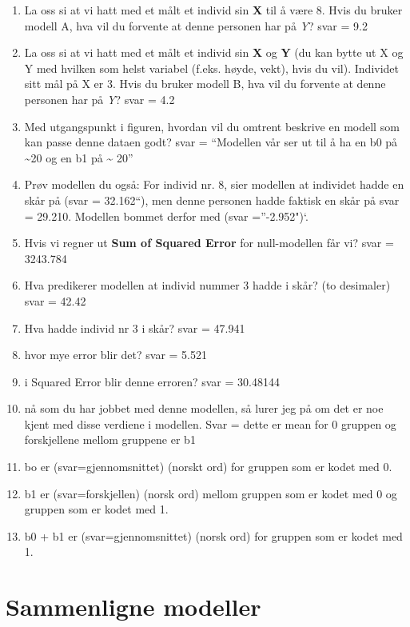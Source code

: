 \documentclass[
]{book}
\begin{document}
\begin{enumerate}
\def\labelenumi{\alph{enumi}.}
\item
  La oss si at vi hatt med et målt et individ sin \textbf{X} til å være 8. Hvis du bruker modell A, hva vil du forvente at denne personen har på \emph{Y}? svar = 9.2
\item
  La oss si at vi hatt med et målt et individ sin \textbf{X} og \textbf{Y} (du kan bytte ut X og Y med hvilken som helst variabel (f.eks. høyde, vekt), hvis du vil). Individet sitt mål på X er 3. Hvis du bruker modell B, hva vil du forvente at denne personen har på \emph{Y}? svar = 4.2
\item
  Med utgangspunkt i figuren, hvordan vil du omtrent beskrive en modell som kan passe denne dataen godt? svar = ``Modellen vår ser ut til å ha en b0 på \textasciitilde20 og en b1 på \textasciitilde{} 20''
\item
  Prøv modellen du også: For individ nr. 8, sier modellen at individet hadde en skår på (svar = 32.162``), men denne personen hadde faktisk en skår på svar = 29.210. Modellen bommet derfor med (svar =''-2.952")`.
\item
  Hvis vi regner ut \textbf{Sum of Squared Error} for null-modellen får vi? svar = 3243.784
\item
  Hva predikerer modellen at individ nummer 3 hadde i skår? (to desimaler) svar = 42.42
\item
  Hva hadde individ nr 3 i skår? svar = 47.941
\item
  hvor mye error blir det? svar = 5.521
\item
  i Squared Error blir denne erroren? svar = 30.48144
\item
  nå som du har jobbet med denne modellen, så lurer jeg på om det er noe kjent med disse verdiene i modellen. Svar = dette er mean for 0 gruppen og forskjellene mellom gruppene er b1
\item
  bo er (svar=gjennomsnittet) (norskt ord) for gruppen som er kodet med 0.
\item
  b1 er (svar=forskjellen) (norsk ord) mellom gruppen som er kodet med 0 og gruppen som er kodet med 1.
\item
  b0 + b1 er (svar=gjennomsnittet) (norsk ord) for gruppen som er kodet med 1.
\end{enumerate}

\hypertarget{sammenligne-modeller-1}{%
\section{Sammenligne modeller}\label{sammenligne-modeller-1}}
\end{document}
